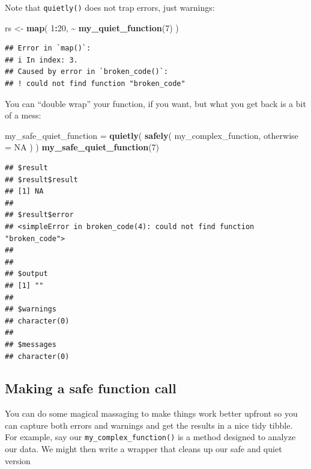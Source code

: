 \documentclass[
]{book}
\newenvironment{Shaded}{\begin{snugshade}}{\end{snugshade}}
\newcommand{\AttributeTok}[1]{\textcolor[rgb]{0.13,0.29,0.53}{#1}}
\newcommand{\ConstantTok}[1]{\textcolor[rgb]{0.56,0.35,0.01}{#1}}
\newcommand{\DecValTok}[1]{\textcolor[rgb]{0.00,0.00,0.81}{#1}}
\newcommand{\FunctionTok}[1]{\textcolor[rgb]{0.13,0.29,0.53}{\textbf{#1}}}
\newcommand{\NormalTok}[1]{#1}
\newcommand{\OtherTok}[1]{\textcolor[rgb]{0.56,0.35,0.01}{#1}}
\newcommand{\SpecialCharTok}[1]{\textcolor[rgb]{0.81,0.36,0.00}{\textbf{#1}}}
\begin{document}
Note that \texttt{quietly()} does not trap errors, just warnings:

\begin{Shaded}
\begin{Highlighting}[]
\NormalTok{rs }\OtherTok{\textless{}{-}} \FunctionTok{map}\NormalTok{( }\DecValTok{1}\SpecialCharTok{:}\DecValTok{20}\NormalTok{, }\SpecialCharTok{\textasciitilde{}} \FunctionTok{my\_quiet\_function}\NormalTok{(}\DecValTok{7}\NormalTok{) )}
\end{Highlighting}
\end{Shaded}

\begin{verbatim}
## Error in `map()`:
## i In index: 3.
## Caused by error in `broken_code()`:
## ! could not find function "broken_code"
\end{verbatim}

You can ``double wrap'' your function, if you want, but what you get back is a bit of a mess:

\begin{Shaded}
\begin{Highlighting}[]
\NormalTok{my\_safe\_quiet\_function }\OtherTok{=} \FunctionTok{quietly}\NormalTok{( }\FunctionTok{safely}\NormalTok{( my\_complex\_function, }\AttributeTok{otherwise =} \ConstantTok{NA}\NormalTok{ ) )}
\FunctionTok{my\_safe\_quiet\_function}\NormalTok{(}\DecValTok{7}\NormalTok{)}
\end{Highlighting}
\end{Shaded}

\begin{verbatim}
## $result
## $result$result
## [1] NA
## 
## $result$error
## <simpleError in broken_code(4): could not find function "broken_code">
## 
## 
## $output
## [1] ""
## 
## $warnings
## character(0)
## 
## $messages
## character(0)
\end{verbatim}

\subsection{Making a safe function call}\label{making-a-safe-function-call}

You can do some magical massaging to make things work better upfront so you can capture both errors and warnings and get the results in a nice tidy tibble.
For example, say our \texttt{my\_complex\_function()} is a method designed to analyze our data.
We might then write a wrapper that cleans up our safe and quiet version
\end{document}
